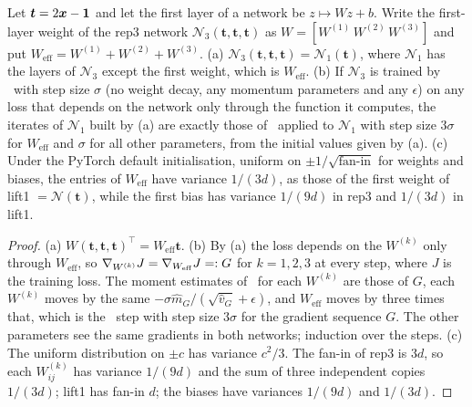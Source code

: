\begin{proposition}\label{sA_proofs:prop:rep3}
Let $\boldsymbol t=2\boldsymbol{x}-\mathbf1$ and let the first layer of a network be $z\mapsto Wz+b$. Write the
first-layer weight of the rep3 network $\mathcal N_3(\boldsymbol t,\boldsymbol t,\boldsymbol t)$ as
$W=[W^{(1)}\,W^{(2)}\,W^{(3)}]$ and put $W_{\mathrm{eff}}=W^{(1)}+W^{(2)}+W^{(3)}$.
(a) $\mathcal N_3(\boldsymbol t,\boldsymbol t,\boldsymbol t)=\mathcal N_1(\boldsymbol t)$, where $\mathcal N_1$ has the layers of
$\mathcal N_3$ except the first weight, which is $W_{\mathrm{eff}}$.
(b) If $\mathcal N_3$ is trained by \Adam\ with step size $\sigma$ (no weight decay, any momentum parameters
and any $\epsilon$) on any loss that depends on the network only through the function it computes,
the iterates of $\mathcal N_1$ built by (a) are exactly those of \Adam\ applied to $\mathcal N_1$ with step size
$3\sigma$ for $W_{\mathrm{eff}}$ and $\sigma$ for all other parameters, from the initial values
given by (a).
(c) Under the PyTorch default initialisation, uniform on $\pm1/\sqrt{\text{fan-in}}$ for weights and
biases, the entries of $W_{\mathrm{eff}}$ have variance $1/(3d)$, as those of the first weight of
lift1 $=\mathcal N(\boldsymbol t)$, while the first bias has variance $1/(9d)$ in rep3 and $1/(3d)$ in lift1.
\end{proposition}
\begin{proof}
(a) $W(\boldsymbol t,\boldsymbol t,\boldsymbol t)^\top=W_{\mathrm{eff}}\boldsymbol t$.
(b) By (a) the loss depends on the $W^{(k)}$ only through $W_{\mathrm{eff}}$, so
$\nabla_{W^{(k)}}J=\nabla_{W_{\mathrm{eff}}}J=:G$ for $k=1,2,3$ at every step, where $J$ is the
training loss. The moment estimates of \Adam\ for each $W^{(k)}$ are those of $G$, each
$W^{(k)}$ moves by the same $-\sigma\hat m_G/(\sqrt{\hat v_G}+\epsilon)$, and $W_{\mathrm{eff}}$ moves
by three times that, which is the \Adam\ step with step size $3\sigma$ for the gradient sequence $G$.
The other parameters see the same gradients in both networks; induction over the steps.
(c) The uniform distribution on $\pm c$ has variance $c^2/3$. The fan-in of rep3 is $3d$, so each
$W^{(k)}_{ij}$ has variance $1/(9d)$ and the sum of three independent copies $1/(3d)$; lift1 has
fan-in $d$; the biases have variances $1/(9d)$ and $1/(3d)$.
\end{proof}

